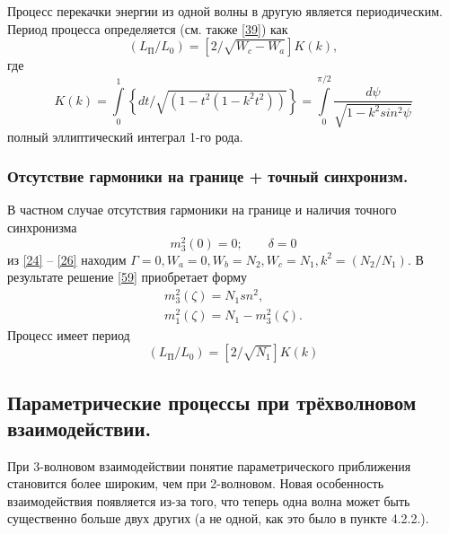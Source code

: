 \documentclass[a4paper]{article}
\begin{document}
	Процесс перекачки энергии из одной волны в другую является периодическим. Период процесса определяется (см. также \eqref{39}) как 
	\begin{equation}
		(L_{\text{П}}/L_{0})=\left[2/\sqrt{W_{c}-W_{a}}\right]K(k),\label{61}
	\end{equation}
	где 
	\begin{equation}
		K(k)=\int\limits_{0}^{1}\left\{dt/\sqrt{(1-t^{2}(1-k^{2}t^{2}))}\right\}=\int\limits_{0}^{\pi/2}\frac{d\psi}{\sqrt{1-k^{2}sin^{2}\psi}} \label{62}
	\end{equation}
	полный эллиптический интеграл 1-го рода.
	\subsubsection{Отсутствие гармоники на границе + точный синхронизм.}
	В частном случае отсутствия гармоники на границе и наличия точного синхронизма
	\begin{equation}
		m_{3}^{2}(0)=0;\qquad\delta=0
		\label{63}
	\end{equation}
	из \eqref{24} – \eqref{26} находим  $\Gamma=0, W_{a}=0, W_{b}=N_{2}, W_{c}=N_{1}, k^{2}=(N_{2}/N_{1}).$
	В результате решение \eqref{59} приобретает форму 
	\begin{equation}
		\begin{aligned}
			m_{3}^{2}(\zeta)=N_{1}sn^{2},\\
			m_{1}^{2}(\zeta)=N_{1}-m_{3}^{2}(\zeta).
		\end{aligned}\tag{59'}\label{59'}
	\end{equation}
	Процесс имеет период  
	\begin{equation}
		(L_{\text{П}}/L_{0})=[2/\sqrt{N_{1}}]K(k)
		\tag{61'}\label{61'}
	\end{equation}
	\subsection{Параметрические процессы при трёхволновом взаимодействии.}
	При 3-волновом взаимодействии понятие параметрического приближения становится более широким, чем при 2-волновом. Новая особенность взаимодействия появляется из-за того, что теперь одна волна может быть существенно больше двух других (а не одной, как это было в пункте 4.2.2.). 
\end{document}
